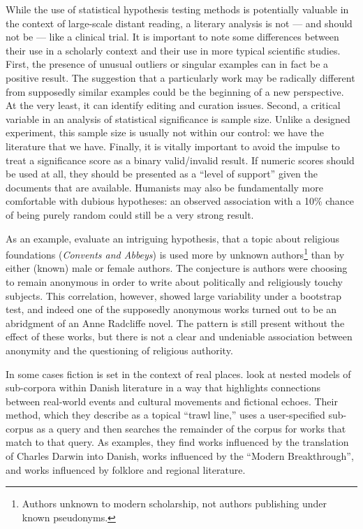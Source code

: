 While the use of statistical hypothesis testing methods is potentially valuable in the context of large-scale distant reading, a literary analysis is not --- and should not be --- like a clinical trial.
It is important to note some differences between their use in a scholarly context and their use in more typical scientific studies.
First, the presence of unusual outliers or singular examples can in fact be a positive result.
The suggestion that a particularly work may be radically different from supposedly similar examples could be the beginning of a new perspective.
At the very least, it can identify editing and curation issues.
Second, a critical variable in an analysis of statistical significance is sample size.
Unlike a designed experiment, this sample size is usually not within our control: we have the literature that we have.
Finally, it is vitally important to avoid the impulse to treat a significance score as a binary valid/invalid result.
If numeric scores should be used at all, they should be presented as a ``level of support'' given the documents that are available.
Humanists may also be fundamentally more comfortable with dubious hypotheses: an observed association with a 10\% chance of being purely random could still be a very strong result.

As an example, \citet{jockers-13b} evaluate an intriguing hypothesis, that a topic about religious foundations ({\em Convents and Abbeys}) is used more by unknown authors\footnote{Authors unknown to modern scholarship, not authors publishing under known pseudonyms.} than by either (known) male or female authors.
The conjecture is authors were choosing to remain anonymous in order to write about politically and religiously touchy subjects.
This correlation, however, showed large variability under a bootstrap test, and indeed one of the supposedly anonymous works turned out to be an abridgment of an Anne Radcliffe novel.
The pattern is still present without the effect of these works, but there is not a clear and undeniable association between anonymity and the questioning of religious authority.

In some cases fiction is set in the context of real places.
\citet{tangherlini-13} look at nested models of sub-corpora within Danish literature in a way that highlights connections between real-world events and cultural movements and fictional echoes.
Their method, which they describe as a topical ``trawl line,'' uses a user-specified sub-corpus as a query and then searches the remainder of the corpus for works that match to that query.
As examples, they find works influenced by the translation of Charles Darwin into Danish, works influenced by the ``Modern Breakthrough'', and works influenced by folklore and regional literature.



